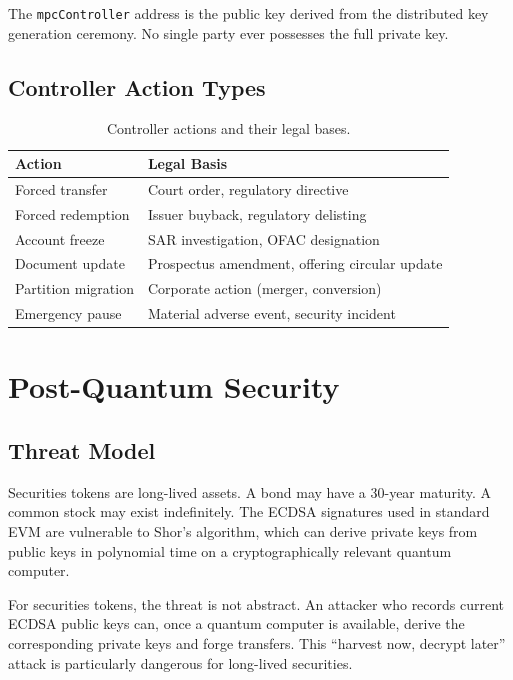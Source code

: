 \documentclass[11pt,a4paper]{article}
\begin{document}
The \texttt{mpcController} address is the public key derived from the distributed key generation ceremony. No single party ever possesses the full private key.

\subsection{Controller Action Types}

\begin{table}[H]
\centering
\caption{Controller actions and their legal bases.}
\label{tab:controller-actions}
\begin{tabular}{lp{6.5cm}}
\toprule
\textbf{Action} & \textbf{Legal Basis} \\
\midrule
Forced transfer & Court order, regulatory directive \\
Forced redemption & Issuer buyback, regulatory delisting \\
Account freeze & SAR investigation, OFAC designation \\
Document update & Prospectus amendment, offering circular update \\
Partition migration & Corporate action (merger, conversion) \\
Emergency pause & Material adverse event, security incident \\
\bottomrule
\end{tabular}
\end{table}

\section{Post-Quantum Security}\label{sec:pq}

\subsection{Threat Model}

Securities tokens are long-lived assets. A bond may have a 30-year maturity. A common stock may exist indefinitely. The ECDSA signatures used in standard EVM are vulnerable to Shor's algorithm, which can derive private keys from public keys in polynomial time on a cryptographically relevant quantum computer.

For securities tokens, the threat is not abstract. An attacker who records current ECDSA public keys can, once a quantum computer is available, derive the corresponding private keys and forge transfers. This ``harvest now, decrypt later'' attack is particularly dangerous for long-lived securities.
\end{document}
